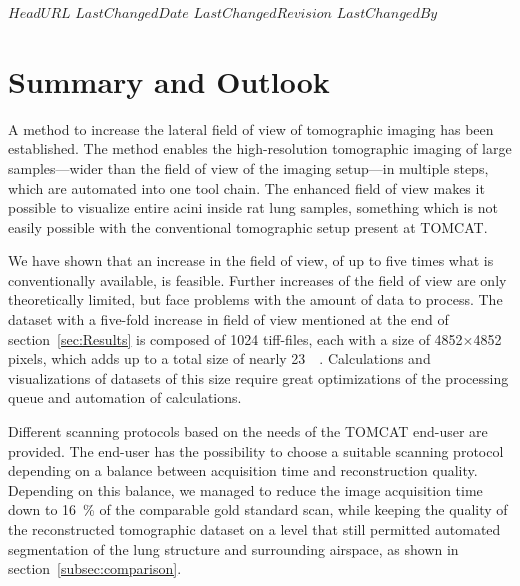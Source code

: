 \svnidlong
{$HeadURL$}
{$LastChangedDate$}
{$LastChangedRevision$}
{$LastChangedBy$}
%
\section{Summary and Outlook}\label{summary and outlook}%

A method to increase the lateral field of view of tomographic imaging has been established. The method enables the high-resolution tomographic imaging of large samples---wider than the field of view of the imaging setup---in multiple steps, which are automated into one tool chain. The enhanced field of view makes it possible to visualize entire acini inside rat lung samples, something which is not easily possible with the conventional tomographic setup present at TOMCAT.

We have shown that an increase in the field of view, of up to five times what is conventionally available, is feasible. Further increases of the field of view are only theoretically limited, but face problems with the amount of data to process. The dataset with a five-fold increase in field of view mentioned at the end of section~\ref{sec:Results} is composed of 1024 tiff-files, each with a size of 4852$\times$4852 pixels, which adds up to a total size of nearly \SI{23}{\giga\byte}. Calculations and visualizations of datasets of this size require great optimizations of the processing queue and automation of calculations.

Different scanning protocols based on the needs of the TOMCAT end-user are provided. The end-user has the possibility to choose a suitable scanning protocol depending on a balance between acquisition time and reconstruction quality. Depending on this balance, we managed to reduce the image acquisition time down to \SI{16}{\percent} of the comparable gold standard scan, while keeping the quality of the reconstructed tomographic dataset on a level that still permitted automated segmentation of the lung structure and surrounding airspace, as shown in section~\ref{subsec:comparison}.